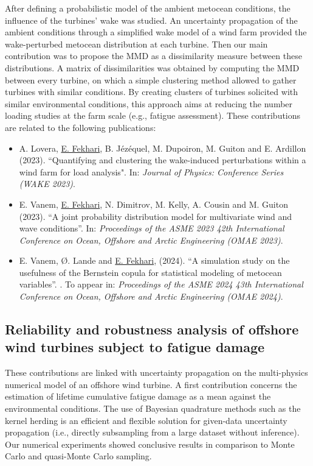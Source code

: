 After defining a probabilistic model of the ambient metocean conditions, the influence of the turbines' wake was studied. 
An uncertainty propagation of the ambient conditions through a simplified wake model of a wind farm provided the wake-perturbed metocean distribution at each turbine.  
Then our main contribution was to propose the MMD as a dissimilarity measure between these distributions. 
A matrix of dissimilarities was obtained by computing the MMD between every turbine, on which a simple clustering method allowed to gather turbines with similar conditions.  
By creating clusters of turbines solicited with similar environmental conditions, this approach aims at reducing the number loading studies at the farm scale (e.g., fatigue assessment).
These contributions are related to the following publications:
\begin{itemize}
    \footnotesize
    \item[\ding{125}] A. Lovera, \underline{E. Fekhari}, B. Jézéquel, M. Dupoiron, M. Guiton and E. Ardillon (2023). ``Quantifying and clustering the wake-induced perturbations within a wind farm for load analysis". In: \textit{Journal of Physics: Conference Series (WAKE 2023)}.
    \item[\ding{125}] E. Vanem, \underline{E. Fekhari}, N. Dimitrov, M. Kelly, A. Cousin and M. Guiton (2023). ``A joint probability distribution model for multivariate wind and wave conditions''. In: \textit{Proceedings of the ASME 2023 42th International Conference on Ocean, Offshore and Arctic Engineering (OMAE 2023)}. 
    \item[\ding{125}] E. Vanem, \O{}. Lande and \underline{E. Fekhari}, (2024). ``A simulation study on the usefulness of the Bernstein copula for statistical modeling of metocean variables''. . To appear in: \textit{Proceedings of the ASME 2024 43th International Conference on Ocean, Offshore and Arctic Engineering (OMAE 2024)}.
\end{itemize}

\subsection*{Reliability and robustness analysis of offshore wind turbines subject to fatigue damage}

These contributions are linked with uncertainty propagation on the multi-physics numerical model of an offshore wind turbine. 
A first contribution concerns the estimation of lifetime cumulative fatigue damage as a mean against the environmental conditions. 
The use of Bayesian quadrature methods such as the kernel herding is an efficient and flexible solution for given-data uncertainty propagation (i.e., directly subsampling from a large dataset without inference). 
Our numerical experiments showed conclusive results in comparison to Monte Carlo and quasi-Monte Carlo sampling. 



